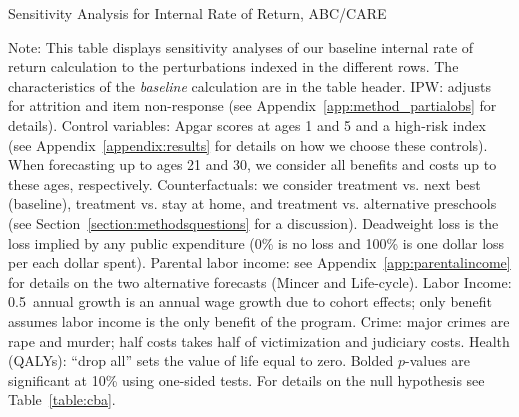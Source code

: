 \begin{table}
\begin{threeparttable}
\caption{Sensitivity Analysis for Internal Rate of Return, ABC/CARE}
\label{table:irrsens}
\centering
\scriptsize

\begin{tablenotes}
\scriptsize
\item Note: This table displays sensitivity analyses of our baseline internal rate of return calculation to the perturbations indexed in the different rows. The characteristics of the \textit{baseline} calculation are in the table header. IPW: adjusts for attrition and item non-response (see  Appendix~\ref{app:method_partialobs} for details). Control variables: Apgar scores at ages 1 and 5 and a high-risk index (see  Appendix~\ref{appendix:results} for details on how we choose these controls). When forecasting up to ages 21 and 30, we consider all benefits and costs up to these ages, respectively. Counterfactuals: we consider treatment vs. next best (baseline), treatment vs. stay at home, and treatment vs. alternative preschools (see Section~\ref{section:methodsquestions} for a discussion). Deadweight loss is the loss implied by any public expenditure (0\% is no loss and 100\% is one dollar loss per each dollar spent). Parental labor income: see  Appendix~\ref{app:parentalincome} for details on the two alternative forecasts (Mincer and Life-cycle). Labor Income: 0.5\ annual growth is an annual wage growth due to cohort effects; only benefit assumes labor income is the only benefit of the program. Crime: major crimes are rape and murder; half costs takes half of victimization and judiciary costs. Health (QALYs): ``drop all'' sets the value of life equal to zero. Bolded $p$-values are significant at 10\% using one-sided tests. For details on the null hypothesis see Table~\ref{table:cba}.
\end{tablenotes}
\end{threeparttable}
\end{table}
\doublespacing

